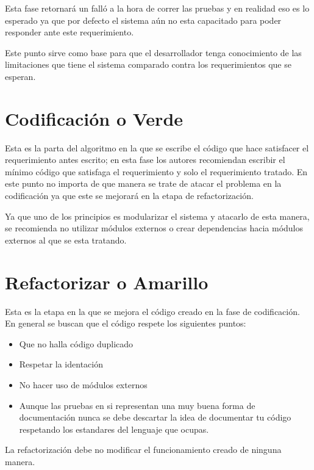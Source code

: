 Esta fase retornará un falló a la hora de correr las pruebas y en realidad eso es lo esperado ya que por defecto el sistema a\'un no esta capacitado para poder responder ante este
requerimiento.

Este punto sirve como base para que el desarrollador tenga conocimiento de las limitaciones que tiene el sistema comparado contra los requerimientos que se esperan.

\section{Codificaci\'on o Verde}

Esta es la parta del algoritmo en la que se escribe el código que hace satisfacer el requerimiento antes escrito; en esta fase los autores recomiendan escribir el mínimo c\'odigo que satisfaga
el requerimiento y solo el requerimiento tratado. En este punto no importa de que manera se trate de atacar el problema en la codificaci\'on ya que este se mejorar\'a en la etapa de refactorizaci\'on.

Ya que uno de los principios es modularizar el sistema y atacarlo de esta manera, se recomienda no utilizar m\'odulos externos o crear dependencias hacia m\'odulos externos al que se
esta tratando.

\section{Refactorizar o Amarillo}
Esta es la etapa en la que se mejora el c\'odigo creado en la fase de codificaci\'on. En general se buscan que el c\'odigo respete los siguientes puntos:

\begin{itemize}
    \item Que no halla c\'odigo duplicado
    \item Respetar la identaci\'on
    \item No hacer uso de m\'odulos externos
    \item Aunque las pruebas en si representan una muy buena forma de documentaci\'on nunca se debe descartar la idea de documentar tu c\'odigo respetando los
        estandares del lenguaje que ocupas.
\end{itemize}

La refactorización debe no modificar el funcionamiento creado de ninguna manera.
